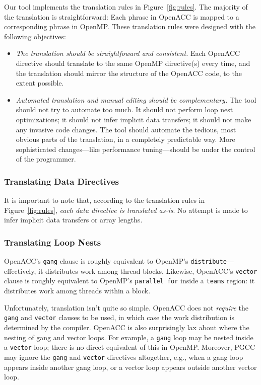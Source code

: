 \documentclass{sig-alternate-05-2015}
\begin{document}
Our tool implements the translation rules in Figure~\ref{fig:rules}.  The
majority of the translation is straightforward: Each phrase in OpenACC is
mapped to a corresponding phrase in OpenMP\@.  These translation rules were
designed with the following objectives:
\begin{itemize}
\item \emph{The translation should be straightfoward and consistent.}
Each OpenACC directive should translate to the same OpenMP directive(s)
every time, and the translation should mirror the structure of the OpenACC
code, to the extent possible.
\item \emph{Automated translation and manual editing should be complementary.}
The tool should not try to automate too much.  It should not perform loop
nest optimizations; it should not infer implicit data transfers; it should
not make any invasive code changes.  The tool should automate the tedious,
most obvious parts of the translation, in a completely predictable way.
More sophisticated changes---like performance tuning---should be under the
control of the programmer.
\end{itemize}

\subsubsection{Translating Data Directives}

It is important to note that, according to the translation rules in
Figure~\ref{fig:rules}, \emph{each data directive is translated as-is}.  No
attempt is made to infer implicit data transfers or array lengths.

\subsubsection{Translating Loop Nests}

OpenACC's \texttt{gang} clause is roughly equivalent to OpenMP's
\texttt{distribute}---effectively, it distributes work among thread blocks.
Likewise, OpenACC's \texttt{vector} clause is roughly equivalent to OpenMP's
\texttt{parallel for} inside a \texttt{teams} region: it distributes work among
threads within a block.

Unfortunately, translation isn't quite so simple.  OpenACC does not
\emph{require} the \texttt{gang} and \texttt{vector} clauses to be used, in
which case the work distribution is determined by the compiler.  OpenACC is
also surprisingly lax about where the nesting of gang and vector loops.  For
example, a \texttt{gang} loop may be nested inside a \texttt{vector} loop;
there is no direct equivalent of this in OpenMP.  Moreover, PGCC may ignore the
\texttt{gang} and \texttt{vector} directives altogether, e.g., when a gang loop
appears inside another gang loop, or a vector loop appears outside another
vector loop.
\end{document}
